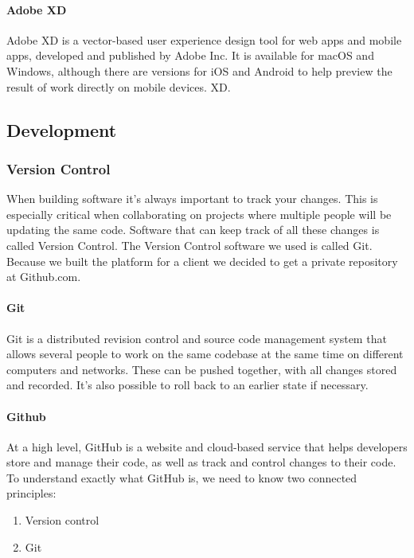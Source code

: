 \paragraph*{Adobe XD}
Adobe XD is a vector-based user experience design tool for web apps and mobile apps, developed and published by Adobe Inc. It is available for macOS and Windows, although there are versions for iOS and Android to help preview the result of work directly on mobile devices. XD.






\subsection{Development}
\subsubsection{Version Control}
When building software it’s always important to track your changes. This is especially critical when collaborating on projects where multiple people will be updating the same code. Software that can keep track of all
these changes is called Version Control. The Version Control software we used is called Git. Because we built
the platform for a client we decided to get a private repository at Github.com.

\paragraph*{Git}
Git is a distributed revision control and source code management system that
allows several people to work on the same codebase at the same time on different
computers and networks. These can be pushed together, with all changes stored and
recorded. It’s also possible to roll back to an earlier state if necessary.
\paragraph*{Github}
At a high level, GitHub is a website and cloud-based service that helps developers store and manage their code, as well as track and control changes to their code. To understand exactly what GitHub is, we need to know two connected principles:
\begin{enumerate}
      \item Version control
      \item Git
\end{enumerate}

